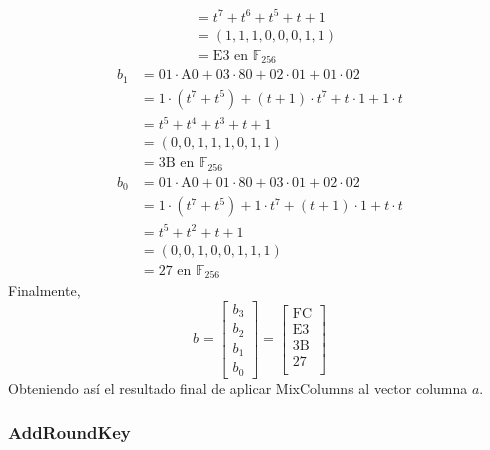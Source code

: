 \begin{ejemplo}
\begin{align}
            &= t^{7} + t^{6} + t^{5} + t + 1 \\
            &= (1, 1, 1, 0, 0, 0, 1, 1) \\
            &= \text{E}3 \text{ en } \mathbb{F}_{256}
        \end{align}
        \begin{align}
            b_{1} &= 01 \cdot \text{A}0 + 03 \cdot 80 + 02 \cdot 01 + 01 \cdot 02 \\
            &= 1 \cdot (t^{7} + t^{5}) + (t + 1) \cdot t^{7} + t \cdot 1 + 1 \cdot t \\
            &= t^{5} + t^{4} + t^{3} + t + 1 \\
            &= (0, 0, 1, 1, 1, 0, 1, 1) \\
            &= 3\text{B} \text{ en } \mathbb{F}_{256}
        \end{align}
        \begin{align}
            b_{0} &= 01 \cdot \text{A}0 + 01 \cdot 80 + 03 \cdot 01 + 02 \cdot 02 \\
            &= 1 \cdot (t^{7} + t^{5}) + 1 \cdot t^{7} + (t + 1) \cdot 1 + t \cdot t \\
            &= t^{5} + t^{2} + t + 1 \\
            &= (0, 0, 1, 0, 0, 1, 1, 1) \\
            &= 27 \text{ en } \mathbb{F}_{256}
        \end{align}
        Finalmente,
        \begin{equation}
            b = 
            \begin{bmatrix}
                b_{3} \\
                b_{2} \\
                b_{1} \\
                b_{0}
            \end{bmatrix}
            =
            \begin{bmatrix}
                \text{FC} \\
                \text{E}3 \\
                3\text{B} \\
                27 \\
            \end{bmatrix}
        \end{equation}
        Obteniendo así el resultado final de aplicar MixColumns al vector columna $a$.
    \end{ejemplo}

    \subsubsection{AddRoundKey}

